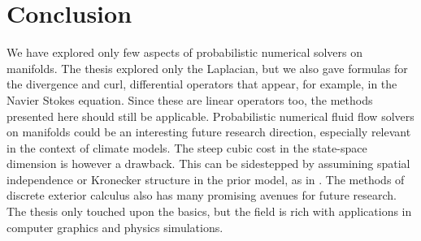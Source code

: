 \section{Conclusion}
We have explored only few aspects of probabilistic numerical solvers on manifolds. The thesis explored only the Laplacian, but we also gave formulas for the divergence and curl, differential operators that appear, for example, in the Navier Stokes equation. Since these are linear operators too, the methods presented here should still be applicable. Probabilistic numerical fluid flow solvers on manifolds could be an interesting future research direction, especially relevant in the context of climate models. The steep cubic cost in the state-space dimension is however a drawback. This can be sidestepped by assumining spatial independence or Kronecker structure in the prior model, as in \cite{kronecker}. The methods of discrete exterior calculus also has many promising avenues for future research. The thesis only touched upon the basics, but the field is rich with applications in computer graphics and physics simulations.
\clearpage
\printbibliography


